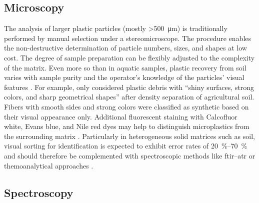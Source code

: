 \subsection{Microscopy}
\label{sec:analytical-techniques:microscopy}

The analysis of larger plastic particles (mostly \SI{>500}{\micro\meter})
is traditionally performed by manual selection under a stereomicroscope. The procedure enables the non-destructive determination of particle numbers, sizes, and shapes at low cost. The degree of sample preparation can be flexibly adjusted to the complexity of the matrix. Even more so than in aquatic samples, plastic recovery from soil varies with sample purity and the operator's knowledge of the particles' visual features \citep{LusherIt2020,FilellaQuestions2015,ZhangDistribution2020}. For example, \citet{CorradiniPredicting2019} only considered plastic debris with ``shiny surfaces, strong colors, and sharp geometrical shapes'' after density separation of agricultural soil. Fibers with smooth sides and strong colors were classified as synthetic based on their visual appearance only. Additional fluorescent staining with Calcofluor white, Evans blue, and Nile red dyes may help to distinguish microplastics from the surrounding matrix \citep{HelmbergerCounterstaining2020,NelDetection2021}. Particularly in heterogeneous solid matrices such as soil, visual sorting for identification is expected to exhibit error rates of \SIrange{20}{70}{\percent} \citep{BlasingPlastics2018} and should therefore be complemented with spectroscopic methods like \ac{ftir}--\ac{atr} or themoanalytical approaches \citep{HeMicroplastics2018}.

\subsection{Spectroscopy}
\label{sec:analytical-techniques:spectroscopy}

